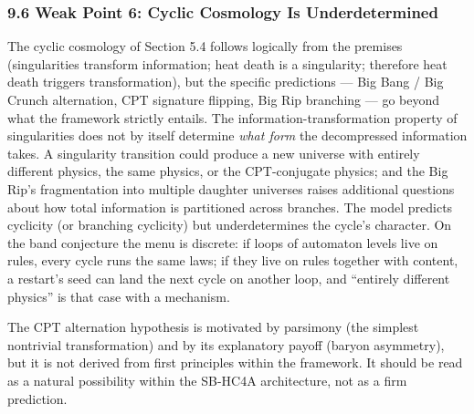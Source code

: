 \documentclass[
]{article}
\begin{document}
\hypertarget{weak-point-6-cyclic-cosmology-is-underdetermined}{%
\subsubsection{9.6 Weak Point 6: Cyclic Cosmology Is
Underdetermined}\label{weak-point-6-cyclic-cosmology-is-underdetermined}}

The cyclic cosmology of Section 5.4 follows logically from the premises
(singularities transform information; heat death is a singularity;
therefore heat death triggers transformation), but the specific
predictions --- Big Bang / Big Crunch alternation, CPT signature
flipping, Big Rip branching --- go beyond what the framework strictly
entails. The information-transformation property of singularities does
not by itself determine \emph{what form} the decompressed information
takes. A singularity transition could produce a new universe with
entirely different physics, the same physics, or the CPT-conjugate
physics; and the Big Rip's fragmentation into multiple daughter
universes raises additional questions about how total information is
partitioned across branches. The model predicts cyclicity (or branching
cyclicity) but underdetermines the cycle's character. On the band
conjecture the menu is discrete: if loops of automaton levels live on
rules, every cycle runs the same laws; if they live on rules together
with content, a restart's seed can land the next cycle on another loop,
and ``entirely different physics'' is that case with a mechanism.

The CPT alternation hypothesis is motivated by parsimony (the simplest
nontrivial transformation) and by its explanatory payoff (baryon
asymmetry), but it is not derived from first principles within the
framework. It should be read as a natural possibility within the SB-HC4A
architecture, not as a firm prediction.
\end{document}
